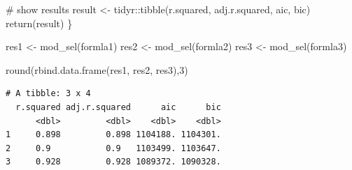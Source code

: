 \documentclass[
  letterpaper,
  DIV=11,
  numbers=noendperiod]{scrreprt}
\newenvironment{Shaded}{\begin{snugshade}}{\end{snugshade}}
\newcommand{\CommentTok}[1]{\textcolor[rgb]{0.37,0.37,0.37}{#1}}
\newcommand{\DecValTok}[1]{\textcolor[rgb]{0.68,0.00,0.00}{#1}}
\newcommand{\FunctionTok}[1]{\textcolor[rgb]{0.28,0.35,0.67}{#1}}
\newcommand{\NormalTok}[1]{\textcolor[rgb]{0.00,0.23,0.31}{#1}}
\newcommand{\OtherTok}[1]{\textcolor[rgb]{0.00,0.23,0.31}{#1}}
\newcommand{\SpecialCharTok}[1]{\textcolor[rgb]{0.37,0.37,0.37}{#1}}
\begin{document}
\begin{Shaded}
\begin{Highlighting}[]
  \CommentTok{\# show results}
\NormalTok{  result }\OtherTok{\textless{}{-}}\NormalTok{ tidyr}\SpecialCharTok{::}\FunctionTok{tibble}\NormalTok{(r.squared, adj.r.squared, aic, bic)}
  \FunctionTok{return}\NormalTok{(result)}
\NormalTok{\}}

\NormalTok{res1 }\OtherTok{\textless{}{-}} \FunctionTok{mod\_sel}\NormalTok{(formla1)}
\NormalTok{res2 }\OtherTok{\textless{}{-}} \FunctionTok{mod\_sel}\NormalTok{(formla2)}
\NormalTok{res3 }\OtherTok{\textless{}{-}} \FunctionTok{mod\_sel}\NormalTok{(formla3)}

\FunctionTok{round}\NormalTok{(}\FunctionTok{rbind.data.frame}\NormalTok{(res1, res2, res3),}\DecValTok{3}\NormalTok{)}
\end{Highlighting}
\end{Shaded}

\begin{verbatim}
# A tibble: 3 x 4
  r.squared adj.r.squared      aic      bic
      <dbl>         <dbl>    <dbl>    <dbl>
1     0.898         0.898 1104188. 1104301.
2     0.9           0.9   1103499. 1103647.
3     0.928         0.928 1089372. 1090328.
\end{verbatim}
\end{document}
